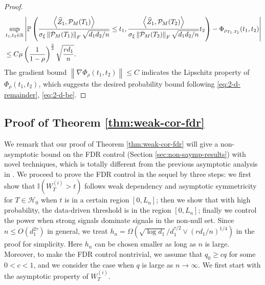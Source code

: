 \documentclass[12pt]{article}
\newcommand{\tF}{{\rm F}}
\newcommand{\abs}[1]{\left\lvert#1\right\rvert}
\newcommand{\norm}[1]{\left\lVert#1\right\rVert}
\newcommand{\PP}{\mathbb{P}}
\newcommand{\R}{\mathbb{R}}
\newcommand{\cH}{\mathcal{H}}
\newcommand{\cP}{\mathcal{P}}
\newcommand{\bbI}{\mathbb{I}}
\def\PP{{\mathbb P}}
\theoremstyle{plain}
\begin{document}
\begin{proof}
\begin{equation}\label{eq:2-d-be}
    \begin{aligned}
       & \sup_{t_1,t_2\in \R} \abs{ \PP \left( \frac{\left\langle  \widehat{Z}_1 , \cP_M(T_1) \right\rangle }{\sigma_{\xi} \norm{\cP_M(T_1) }_\tF  \sqrt{d_1 d_2/n}}\le t_1, \frac{\left\langle  \widehat{Z}_1 , \cP_M(T_2) \right\rangle }{\sigma_{\xi} \norm{\cP_M(T_2) }_\tF  \sqrt{d_1 d_2/n}} 
        t_2  \right) - \Phi_{\rho_{T_1,T_2}}(t_1,t_2)}
        \\
       &\le C \mu \left(\frac{1}{1-\rho}\right)^{\frac{3}{2}} \sqrt{\frac{r d_1}{n}}.
    \end{aligned}
\end{equation}
The gradient bound  $\norm{\nabla \Phi_{\rho} (t_1,t_2)}\le C$ indicates the Lipschitz property of $\Phi_{\rho} (t_1,t_2)$, which suggests the desired probability bound following \eqref{eq:2-d-remainder}, \eqref{eq:2-d-be}.
\end{proof}


\subsection{Proof of Theorem \ref{thm:weak-cor-fdr}}
We remark that our proof of Theorem \ref{thm:weak-cor-fdr} will give a non-asymptotic bound on the FDR control (Section \ref{sec:non-saymp-results}) with novel techniques, which is totally different from the previous asymptotic analysis in \cite{du2021false,dai2022false}. We proceed to prove the FDR control in the sequel by three steps: we first show that $\bbI(W_{T}^{(i)}>t) $ follows weak dependency and asymptotic symmetricity for $T\in\cH_0$ when $t$ is in a certain region $[0,L_n]$; then we show that with high probability, the data-driven threshold is in the region $[0,L_n]$; finally we control the power when strong signals dominate signals in the non-null set. Since $n\le O(d_1^{2\tau} )$ in general, we treat $h_n=\Omega({\sqrt{\log d_1}/{d_1^{\tau/2} } }\vee (rd_1/n)^{1/4} ) $ in the proof for simplicity. Here $h_n$ can be chosen smaller as long as $n$ is large. Moreover, to make the FDR control nontrivial, we assume that $q_0\ge c q$ for some $0<c<1$, and we consider the case when $q$ is large as $n\to \infty$.  We first start with the asymptotic property of ${W}^{(i)}_{T}$.
\end{document}
